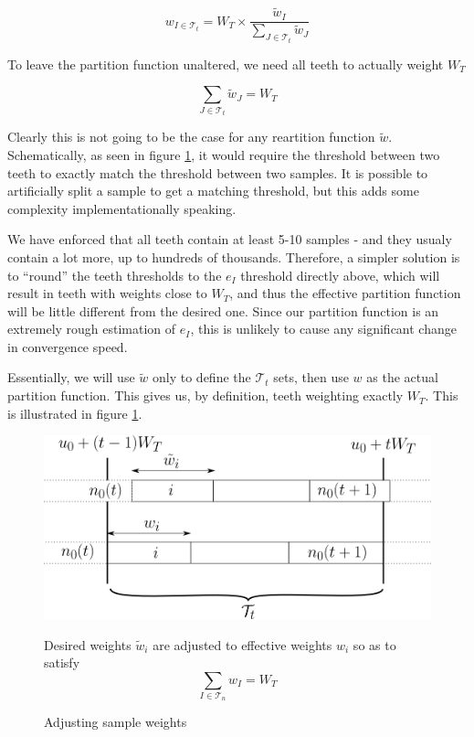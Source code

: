 \documentclass[./thesis.tex]{subfiles}
\begin{document}
\begin{equation}
w_{I \in \mathcal{T}_t} = W_T \times \frac{\tilde w_I}{\sum_{J \in \mathcal{T}_t} \tilde w_J}
\end{equation}

To leave the partition function unaltered, we need all teeth to actually weight $W_T$

\begin{equation}
\sum_{J \in \mathcal{T}_t} \tilde w_J = W_T
\end{equation}

Clearly this is not going to be the case for any reartition function $\tilde w$. Schematically, as seen in figure \ref{fig:toothbuilding}, it would require the threshold between two teeth to exactly match the threshold between two samples. It is possible to artificially split a sample to get a matching threshold, but this adds some complexity implementationally speaking.

We have enforced that all teeth contain at least 5-10 samples - and they usualy contain a lot more, up to hundreds of thousands. Therefore, a simpler solution is to ``round'' the teeth thresholds to the $e_I$ threshold directly above, which will result in teeth with weights close to $W_T$, and thus the effective partition function will be little different from the desired one. Since our partition function is an extremely rough estimation of $e_I$, this is unlikely to cause any significant change in convergence speed.

Essentially, we will use $\tilde w$ only to define the $\mathcal{T}_t$ sets, then use $w$ as the actual partition function. This gives us, by definition, teeth weighting exactly $W_T$.
This is illustrated in figure \ref{fig:toothbuilding}.
 
 \begin{figure}[h!]
	\begin{center}
		\includegraphics[width=0.9\columnwidth]{figures/pt2/toothbuilding}
		\caption{Adjusting sample weights}
		\label{fig:toothbuilding}
		 Desired weights $\tilde w_i$ are adjusted to effective weights $w_i$ so as to satisfy
		 $$\sum_{I \in \mathcal{T}_n} w_I = W_T$$
	\end{center}
\end{figure}
\end{document}
